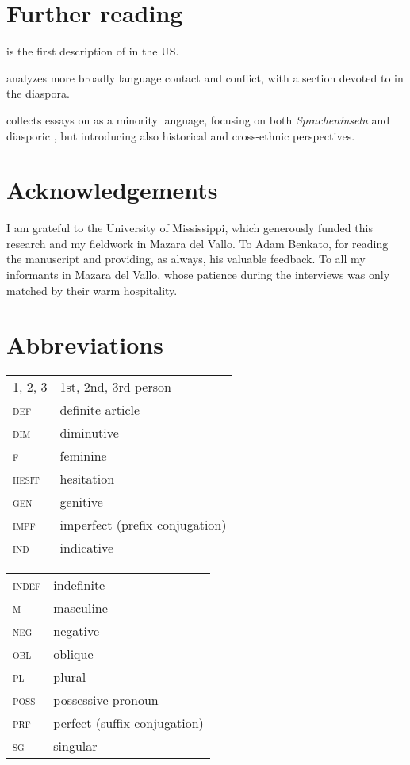 \documentclass[output=paper]{langsci/langscibook}
\begin{document}
\section*{Further reading}
\begin{furtherreading}
\item[\citet{Rouchdy_arabic_1992}] is the first description of  in the US.
\item[\citet{Rouchdy2002}] analyzes more broadly language contact and conflict, with a section devoted to  in the {diaspora}.
\item[\citet{Owens2000editor}] collects essays on  as a minority language, {focusing} on both \textit{Spracheninseln} and diasporic , but introducing also historical and cross-ethnic perspectives.
\end{furtherreading}
 
 \section*{Acknowledgements}
I am grateful to the University of Mississippi, which generously funded this research and my fieldwork in {Mazara del Vallo}. To Adam Benkato, for reading the manuscript and providing, as always, his valuable feedback. To all my informants in {Mazara del Vallo}, whose patience during the interviews was only matched by their warm hospitality.
 
 \section*{Abbreviations}

\begin{tabularx}{.55\textwidth}{@{}lQ@{}}
\textsc{1, 2, 3} & 1st, 2nd, 3rd person \\
\textsc{def} & {definite} {article} \\
\textsc{dim} & {diminutive} \\
\textsc{f} & feminine \\
\textsc{hesit} & hesitation \\
\textsc{gen} & genitive \\
\textsc{impf} & imperfect (prefix conjugation) \\
\textsc{ind} & indicative \\
\end{tabularx}%
\begin{tabularx}{.5\textwidth}{@{}lQ@{}}
\textsc{indef} & indefinite \\
\textsc{m} & masculine \\
\textsc{neg} & negative \\
\textsc{obl} & oblique \\
\textsc{pl} & plural \\
\textsc{poss} & possessive pronoun \\
\textsc{prf} & perfect (suffix conjugation) \\
\textsc{sg} & singular \\
\end{tabularx}%


\sloppy\printbibliography[heading=subbibliography,notkeyword=this]
\end{document}
